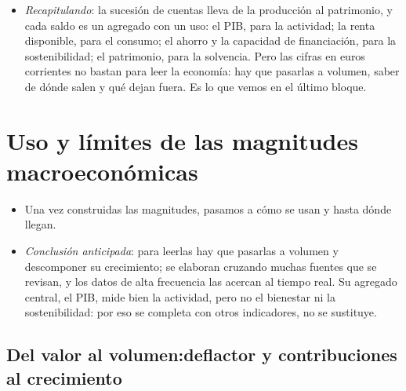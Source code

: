 \documentclass[11pt]{article}
\begin{document}
\begin{itemize}
\item \emph{Recapitulando}: la sucesión de cuentas lleva de la producción al patrimonio, y cada saldo es un agregado con un uso: el PIB, para la actividad; la renta disponible, para el consumo; el ahorro y la capacidad de financiación, para la sostenibilidad; el patrimonio, para la solvencia. Pero las cifras en euros corrientes no bastan para leer la economía: hay que pasarlas a volumen, saber de dónde salen y qué dejan fuera. Es lo que vemos en el último bloque.
\end{itemize}

\section{Uso y límites de las magnitudes macroeconómicas}\label{sec:uso-limites}

\begin{itemize}
\item Una vez construidas las magnitudes, pasamos a cómo se usan y hasta dónde llegan.
\item \emph{Conclusión anticipada}: para leerlas hay que pasarlas a volumen y descomponer su crecimiento; se elaboran cruzando muchas fuentes que se revisan, y los datos de alta frecuencia las acercan al tiempo real. Su agregado central, el PIB, mide bien la actividad, pero no el bienestar ni la sostenibilidad: por eso se completa con otros indicadores, no se sustituye.
\end{itemize}

\subsection{Del valor al volumen:\cortetitulo deflactor y contribuciones al crecimiento}\label{sec:volumen}
\end{document}
